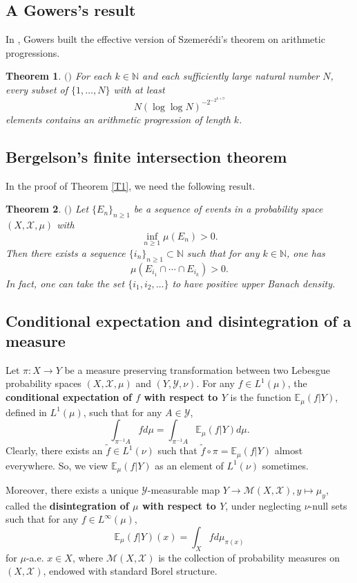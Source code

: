 \documentclass[reqno,12pt]{amsart}
\newtheorem{thm}{Theorem}[section]
\def \N {\mathbb N}
\def \E {\mathbb E}
\def \X {\mathcal{X}}
\def \Y {\mathcal{Y}}
\numberwithin{equation}{section}
\begin{document}
\subsection{A Gowers's result}
In \cite{Gowers}, Gowers built the effective version of Szemer\'edi's theorem on arithmetic progressions.
\begin{thm}\label{CT1}
	$($\cite[Theorem 1.3]{Gowers}$)$ For each $k\in \N$ and each sufficiently large natural number $N$, every subset of $\{1,\ldots,N\}$ with at least $$N(\log \log N)^{-2^{-2^{k+9}}}$$ elements contains an arithmetic progression of length $k$.
\end{thm}
\subsection{Bergelson's finite intersection theorem}
In the proof of Theorem \ref{T1}, we need the following result.
\begin{thm}\label{CT2}
	$($\cite[Theorem 1.1]{B85}$)$ Let $\{E_n\}_{n\ge 1}$ be a sequence of events in a probability space $(X,\X,\mu)$ with $$\inf_{n\ge 1}\mu(E_n)>0.$$ Then there exists a sequence $\{i_n\}_{n\ge 1}\subset \N$ such that for any $k\in \N$, one has $$\mu(E_{i_1}\cap \cdots \cap E_{i_k})>0.$$ In fact, one can take the set $\{i_1,i_2,\ldots\}$ to have positive upper Banach density.
\end{thm}

\subsection{Conditional expectation and disintegration of a measure}
Let $\pi:X\to Y$ be a measure preserving transformation between two Lebesgue probability spaces $(X,\X,\mu)$ and $(Y,\Y,\nu)$. For any $f\in L^{1}(\mu)$, the \textbf{conditional expectation of $f$ with respect to $Y$} is the function $\E_{\mu}(f|Y)$, defined in $L^{1}(\mu)$, such that for any $A\in \Y$, $$\int_{\pi^{-1}A}fd\mu=\int_{\pi^{-1}A}\E_{\mu}(f|Y)d\mu.$$
Clearly, there exists an $\tilde{f}\in L^{1}(\nu)$ such that $\tilde{f}\circ \pi=\E_{\mu}(f|Y)$ almost everywhere. So, we view $\E_{\mu}(f|Y)$ as an element of $L^{1}(\nu)$ sometimes.

Moreover, there exists a unique $\Y$-measurable map $Y\to \mathcal{M}(X,\X),y\mapsto \mu_y$, called the \textbf{disintegration of $\mu$ with respect to $Y$}, under neglecting $\nu$-null sets such that for any $f\in L^{\infty}(\mu)$, $$\E_{\mu}(f|Y)(x)=\int_{X}fd\mu_{\pi(x)}$$ for $\mu$-a.e. $x\in X$, where $\mathcal{M}(X,\X)$ is the collection of probability measures on $(X,\X)$, endowed with standard Borel structure.
\end{document}
